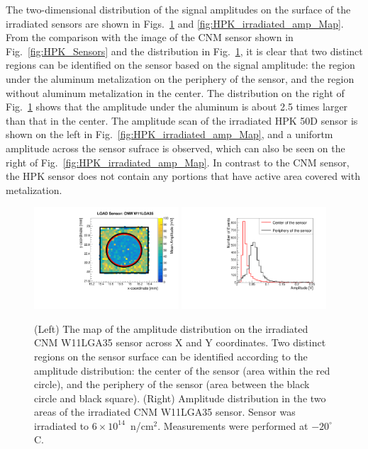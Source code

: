 \documentclass[preprint,1p]{elsarticle}
\begin{document}
The two-dimensional distribution of the signal amplitudes on the surface of the
irradiated sensors are shown in Figs.~\ref{fig:CNM_irradiated_amp_Map} and
\ref{fig:HPK_irradiated_amp_Map}. From the comparison with the image of the CNM
sensor shown in Fig.~\ref{fig:HPK_Sensors} and the distribution in
Fig.~\ref{fig:CNM_irradiated_amp_Map}, it is clear that two distinct regions can
be identified on the sensor based on the signal amplitude: the region under the
aluminum metalization on the periphery of the sensor, and the region without
aluminum metalization in the center. The distribution on the right of
Fig.~\ref{fig:CNM_irradiated_amp_Map} shows that the amplitude under the
aluminum is about 2.5 times larger than that in the center. The amplitude scan
of the irradiated HPK 50D sensor is shown on the left in
Fig.~\ref{fig:HPK_irradiated_amp_Map}, and a unifortm amplitude across the
sensor sufrace is observed, which can also be seen on the right of
Fig.~\ref{fig:HPK_irradiated_amp_Map}. In contrast to the CNM sensor, the HPK
sensor does not contain any portions that have active area covered with
metalization.


\begin{figure}[htbp] 
\centering
\includegraphics[width=0.48\textwidth]{figs/USCSBoard_HPK50DIrradiated-CNMW11LGA35_Run936-961/CNM_irradiated_amp_Map.pdf} \hfill
\includegraphics[width=0.48\textwidth]{figs/USCSBoard_HPK50DIrradiated-CNMW11LGA35_Run936-961/CNM_irradiated_amp_1D.pdf} 
\caption{(Left) The map of the amplitude distribution on the irradiated CNM W11LGA35 sensor across X and Y coordinates. Two distinct regions on the sensor surface can be identified according to the amplitude distribution: the center of the sensor (area within the red circle), and the periphery of the sensor (area between the black circle and black square). (Right) Amplitude distribution in the two areas of the irradiated CNM W11LGA35 sensor.  Sensor was irradiated to $6\times 10^{14}$~n/cm$^2$. Measurements were performed at $-20^{\circ}$C.} 
\label{fig:CNM_irradiated_amp_Map} 
\end{figure} 
\end{document}
